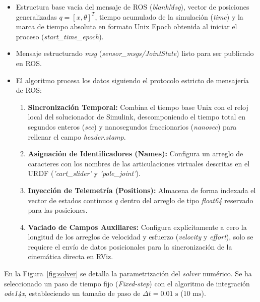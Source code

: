 \documentclass[11pt,fleqn]{book} %
\begin{document}
\begin{itemize}[leftmargin=1.5cm, topsep=1mm, itemsep=0mm, parsep=0mm]
	\item[\textbf{Entradas:}] Estructura base vacía del mensaje de ROS (\textit{blankMsg}), vector de posiciones generalizadas $q = [x, \theta]^T$, tiempo acumulado de la simulación (\textit{time}) y la marca de tiempo absoluta en formato Unix Epoch obtenida al iniciar el proceso (\textit{start\_time\_epoch}).
	\item[\textbf{Salidas:}] Mensaje estructurado \textit{msg} (\textit{sensor\_msgs/JointState}) listo para ser publicado en ROS.
	\item[\textbf{Operación:}] El algoritmo procesa los datos siguiendo el protocolo estricto de mensajería de ROS:
	\begin{enumerate}[leftmargin=0.5cm, topsep=1mm, itemsep=0mm]
		\item \textbf{Sincronización Temporal:} Combina el tiempo base Unix con el reloj local del solucionador de Simulink, descomponiendo el tiempo total en segundos enteros (\textit{sec}) y nanosegundos fraccionarios (\textit{nanosec}) para rellenar el campo \textit{header.stamp}.
		
		\item \textbf{Asignación de Identificadores (Names):} Configura un arreglo de caracteres con los nombres de las articulaciones virtuales descritas en el URDF (\textit{'cart\_slider'} y \textit{'pole\_joint'}). 
		
		\item \textbf{Inyección de Telemetría (Positions):} Almacena de forma indexada el vector de estados continuos $q$ dentro del arreglo de tipo \textit{float64} reservado para las posiciones.
		
		\item \textbf{Vaciado de Campos Auxiliares:} Configura explícitamente a cero la longitud de los arreglos de velocidad y esfuerzo (\textit{velocity} y \textit{effort}), solo se requiere el envío de datos posicionales para la sincronización de la cinemática directa en RViz.
	\end{enumerate}
\end{itemize}

En la Figura~\ref{fig:solver} se detalla la parametrización del \textit{solver} numérico. Se ha seleccionado un paso de tiempo fijo (\textit{Fixed-step}) con el algoritmo de integración \textit{ode14x}, estableciendo un tamaño de paso de $\Delta t = 0.01\text{ s}$ ($10\text{ ms}$). 
\end{document}
